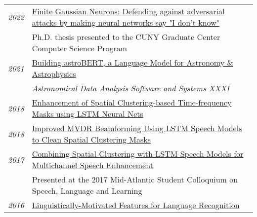 \documentclass[a4paper,10pt]{article}
\begin{document}
    \begin{tabular}{rp{15.5cm}}
    
        \emph{2022} & \href{https://scixplorer.org/abs/2023arXiv230607796G/abstract}{Finite Gaussian Neurons: Defending against adversarial attacks by making neural networks say "I don't know"} \\
        \hphantom{\textbf{Hunter}} & \small{Ph.D. thesis presented to the CUNY Graduate Center Computer Science Program}
        \vspace{0.15cm} \\        

        \emph{2021} & \href{https://scixplorer.org/abs/2024ASPC..535..119G/abstract}{Building astroBERT, a Language Model for Astronomy \& Astrophysics}\\
        & \small{{\em Astronomical Data Analysis Software and Systems XXXI}}
        \vspace{0.15cm} \\

        \emph{2018} & \href{https://grezesf.github.io/papers/2018_ICASSP18__Enhancement_of_Spatial_Clustering_Based_Time_Frequency_Masks_using_LSTM_Neural_Networks.pdf}{Enhancement of Spatial Clustering-based Time-frequency Masks using LSTM Neural Nets}
        \vspace{0.15cm} \\

        \emph{2018} & \href{https://grezesf.github.io/papers/2018_IS18_Improved_MVDR_Beamforming_Using_LSTM_Speech_Models_to_Clean_Spatial_Clustering_Masks.pdf}{Improved MVDR Beamforming Using LSTM Speech Models to Clean Spatial Clustering Masks}
        \vspace{0.15cm} \\

        \emph{2017} & \href{https://grezesf.github.io/papers/2017_IS17_Combining_Spatial_Clustering_with_LSTM_Speech_Models_for_Multichannel_Speech_Enhancement.pdf}{Combining Spatial Clustering with LSTM Speech Models for Multichannel Speech Enhancement}\\
        & \small{Presented at the 2017 Mid-Atlantic Student Colloquium on Speech, Language and Learning}
        \vspace{0.15cm} \\

        \emph{2016} & \href{https://grezesf.github.io/papers/2015_LRE15_linguistically-motivated-features.pdf}{Linguistically-Motivated Features for Language Recognition}
        \vspace{0.15cm} \\


\end{tabular}
\end{document}

